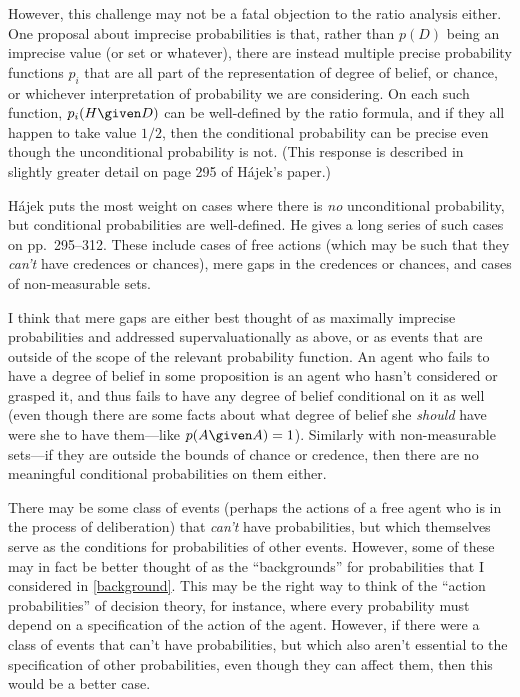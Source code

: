 However, this challenge may not be a fatal objection to the ratio analysis either. One proposal about imprecise probabilities is that, rather than $p(D)$ being an imprecise value (or set or whatever), there are instead multiple precise probability functions $p_i$ that are all part of the representation of degree of belief, or chance, or whichever interpretation of probability we are considering. On each such function, $p_i(H \given D)$ can be well-defined by the ratio formula, and if they all happen to take value $1/2$, then the conditional probability can be precise even though the unconditional probability is not. (This response is described in slightly greater detail on page 295 of H\'{a}jek's paper.)

H\'{a}jek puts the most weight on cases where there is \emph{no} unconditional probability, but conditional probabilities are well-defined. He gives a long series of such cases on pp.\ 295--312. These include cases of free actions (which may be such that they \emph{can't} have credences or chances), mere gaps in the credences or chances, and cases of non-measurable sets. 

I think that mere gaps are either best thought of as maximally imprecise probabilities and addressed supervaluationally as above, or as events that are outside of the scope of the relevant probability function. An agent who fails to have a degree of belief in some proposition is an agent who hasn't considered or grasped it, and thus fails to have any degree of belief conditional on it as well (even though there are some facts about what degree of belief she \emph{should} have were she to have them---like $p(A \given A)=1$). Similarly with non-measurable sets---if they are outside the bounds of chance or credence, then there are no meaningful conditional probabilities on them either.

There may be some class of events (perhaps the actions of a free agent who is in the process of deliberation) that \emph{can't} have probabilities, but which themselves serve as the conditions for probabilities of other events. However, some of these may in fact be better thought of as the ``backgrounds'' for probabilities that I considered in \autoref{background}. This may be the right way to think of the ``action probabilities'' of decision theory, for instance, where every probability must depend on a specification of the action of the agent. However, if there were a class of events that can't have probabilities, but which also aren't essential to the specification of other probabilities, even though they can affect them, then this would be a better case.

